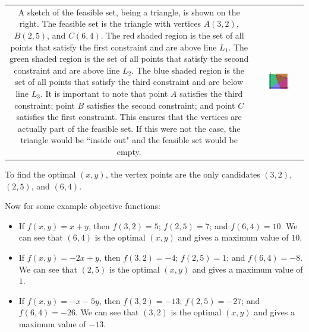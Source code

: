 \documentclass{article}
\begin{document}
\vspace{5mm}

\begin{tabular}{cc}
\parbox{0.5\textwidth}{
A sketch of the feasible set, being a triangle, is shown on the right. The feasible set is the triangle with vertices \(A(3, 2)\), \(B(2, 5)\), and \(C(6, 4)\). The red shaded region is the set of all points that satisfy the first constraint and are above line \(L_1\). The green shaded region is the set of all points that satisfy the second constraint and are above line \(L_2\). The blue shaded region is the set of all points that satisfy the third constraint and are below line \(L_3\). It is important to note that point \(A\) satisfies the third constraint; point \(B\) satisfies the second constraint; and point \(C\) satisfies the first constraint. This ensures that the vertices are actually part of the feasible set. If this were not the case, the triangle would be ``inside out" and the feasible set would be empty.
} & \parbox{0.5\textwidth}{
\includegraphics[width = 0.5\textwidth]{feasible_set_1}
}
\end{tabular}

To find the optimal \((x, y)\), the vertex points are the only candidates \((3, 2)\), \((2, 5)\), and \((6, 4)\).

Now for some example objective functions:
\begin{itemize}
\item If \(f(x, y) = x + y\), then \(f(3, 2) = 5\); \(f(2, 5) = 7\); and \(f(6, 4) = 10\). We can see that \((6, 4)\) is the optimal \((x, y)\) and gives a maximum value of \(10\).
\item If \(f(x, y) = -2x + y\), then \(f(3, 2) = -4\); \(f(2, 5) = 1\); and \(f(6, 4) = -8\). We can see that \((2, 5)\) is the optimal \((x, y)\) and gives a maximum value of \(1\).
\item If \(f(x, y) = -x - 5y\), then \(f(3, 2) = -13\); \(f(2, 5) = -27\); and \(f(6, 4) = -26\). We can see that \((3, 2)\) is the optimal \((x, y)\) and gives a maximum value of \(-13\).
\end{itemize}
\end{document}
